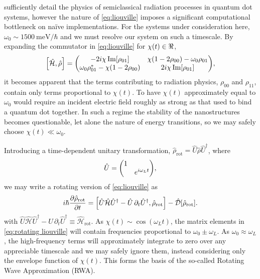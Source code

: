 \documentclass[conference]{IEEEtran}
\begin{document}
 sufficiently detail the physics of semiclassical radiation processes in quantum dot systems, however the nature of \cref{eq:liouville} imposes a significant computational bottleneck on na\"ive implementations.
For the systems under consideration here, $\omega_0 \sim \SI{1500}{\milli\eV}/\hbar$ and we must resolve our system on such a timescale.
By expanding the commutator in \cref{eq:liouville} for $\chi(t) \in \real$,
\begin{equation}
  \commutator{\hat{\mathcal{H}}}{\hat{\rho}} =
  \mqty(
    -2 i \chi \Im[\rho_{01}] & \chi\qty(1 - 2 \rho_{00}) - \omega_0 \rho_{01} \\
    \omega_0 \rho_{01}^* - \chi\qty(1 - 2\rho_{00}) & 2 i \chi \Im[\rho_{01}]
  ),
\end{equation}
it becomes apparent that the terms contributing to radiation physics, $\rho_{00}$ and $\rho_{11}$, contain only terms proportional to $\chi(t)$. 
To have $\chi(t)$ approximately equal to $\omega_0$ would require an incident electric field roughly as strong as that used to bind a quantum dot together.
In such a regime the stability of the nanostructures becomes questionable, let alone the nature of energy transitions, so we may safely choose $\chi(t) \ll \omega_0$.


Introducing a time-dependent unitary transformation, $\hat{\rho}_\text{rot} = \hat{U}\hat{\rho}\hat{U}^\dagger$, where
\begin{equation}
  \hat{U} = \mqty(\dmat{1, e^{i \omega_L t}}),
  \label{eq:unitary transformation}
\end{equation}
we may write a rotating version of \cref{eq:liouville} as
\begin{equation}
  i \hbar \pdv{\hat{\rho}_\text{rot}}{t} = \commutator{\hat{U} \hat{\mathcal{H}} \hat{U}^\dagger - \hat{U} \, \partial_t \hat{U}^\dagger}{\hat{\rho}_\text{rot}} - \hat{\mathcal{D}}[\hat{\rho}_\text{rot}].
  \label{eq:rotating liouville}
\end{equation}
with $\hat{U} \hat{\mathcal{H}} \hat{U}^\dagger - \hat{U} \, \partial_t \hat{U}^\dagger \equiv \hat{\mathcal{H}}_\text{rot}$.  
As $\chi(t) \sim \cos(\omega_L t)$, the matrix elements in \cref{eq:rotating liouville} will contain frequencies proportional to $\omega_0 \pm \omega_L$.
As $\omega_0 \approx \omega_L$, the high-frequency terms will approximately integrate to zero over any appreciable timescale and we may safely ignore them, instead considering only the envelope function of $\chi(t)$. This forms the basis of the so-called Rotating Wave Approximation (RWA)\cite{Allen1987}.
\end{document}
